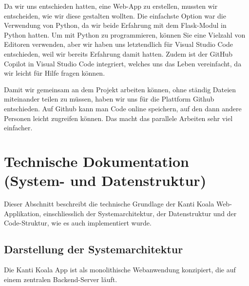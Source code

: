 \documentclass[12pt,a4paper]{report}
\begin{document}
Da wir uns entschieden hatten, eine Web-App zu erstellen, mussten wir entscheiden, wie wir diese gestalten wollten. Die einfachste Option war die Verwendung von Python, da wir beide Erfahrung mit dem Flask-Modul in Python hatten. Um mit Python zu programmieren, können Sie eine Vielzahl von Editoren verwenden, aber wir haben uns letztendlich für Visual Studio Code entschieden, weil wir bereits Erfahrung damit hatten. Zudem ist der GitHub Copilot in Visual Studio Code integriert, welches uns das Leben vereinfacht, da wir leicht für Hilfe fragen können.

Damit wir gemeinsam an dem Projekt arbeiten können, ohne ständig Dateien miteinander teilen zu müssen, haben wir uns für die Plattform Github entschieden. Auf Github kann man Code online speichern, auf den dann andere Personen leicht zugreifen können. Das macht das parallele Arbeiten sehr viel einfacher. 


\section{Technische Dokumentation (System- und Datenstruktur)}
Dieser Abschnitt beschreibt die technische Grundlage der Kanti Koala Web-Applikation, einschliesslich der Systemarchitektur, der Datenstruktur und der Code-Struktur, wie es auch implementiert wurde.

\subsection{Darstellung der Systemarchitektur}
Die Kanti Koala App ist als monolithische Webanwendung konzipiert, die auf einem zentralen Backend-Server läuft.
\end{document}

